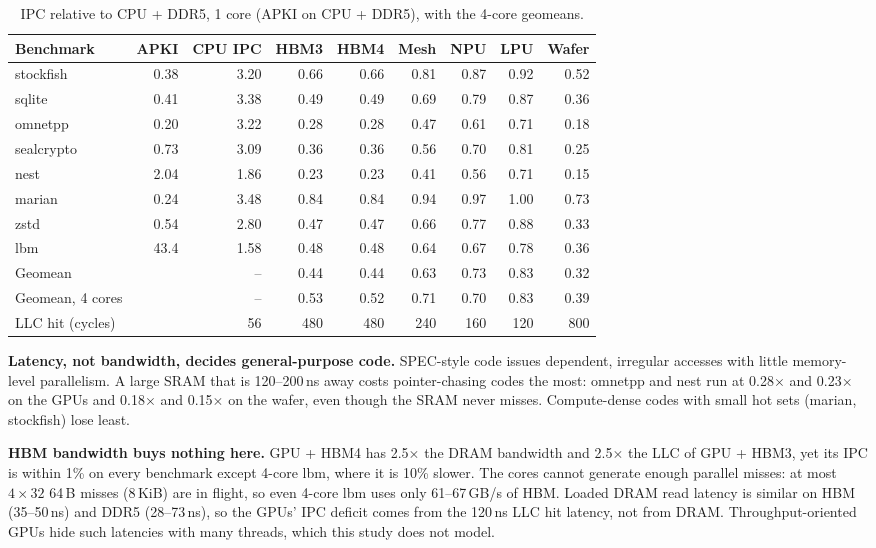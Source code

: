 \documentclass[12pt]{article}
\newcommand{\tmx}{\ensuremath{\times}}
\begin{document}
\begin{table}[htbp]
\centering
\caption{IPC relative to CPU + DDR5, 1 core (APKI on CPU + DDR5), with the 4-core geomeans.}
\label{tab:spec1}
\small
\setlength{\tabcolsep}{4pt}
\begin{tabular}{@{}lrrrrrrrr@{}}
\toprule
Benchmark & APKI & CPU IPC & HBM3 & HBM4 & Mesh & NPU & LPU & Wafer\\
\midrule
stockfish & 0.38 & 3.20 & 0.66 & 0.66 & 0.81 & 0.87 & 0.92 & 0.52\\
sqlite & 0.41 & 3.38 & 0.49 & 0.49 & 0.69 & 0.79 & 0.87 & 0.36\\
omnetpp & 0.20 & 3.22 & 0.28 & 0.28 & 0.47 & 0.61 & 0.71 & 0.18\\
sealcrypto & 0.73 & 3.09 & 0.36 & 0.36 & 0.56 & 0.70 & 0.81 & 0.25\\
nest & 2.04 & 1.86 & 0.23 & 0.23 & 0.41 & 0.56 & 0.71 & 0.15\\
marian & 0.24 & 3.48 & 0.84 & 0.84 & 0.94 & 0.97 & 1.00 & 0.73\\
zstd & 0.54 & 2.80 & 0.47 & 0.47 & 0.66 & 0.77 & 0.88 & 0.33\\
lbm & 43.4 & 1.58 & 0.48 & 0.48 & 0.64 & 0.67 & 0.78 & 0.36\\
\midrule
Geomean & & -- & 0.44 & 0.44 & 0.63 & 0.73 & 0.83 & 0.32\\
Geomean, 4 cores & & -- & 0.53 & 0.52 & 0.71 & 0.70 & 0.83 & 0.39\\
LLC hit (cycles) & & 56 & 480 & 480 & 240 & 160 & 120 & 800\\
\bottomrule
\end{tabular}
\end{table}





\textbf{Latency, not bandwidth, decides general-purpose code.} SPEC-style code issues dependent, irregular accesses with little memory-level parallelism. A large SRAM that is 120--200\,ns away costs pointer-chasing codes the most: omnetpp and nest run at 0.28\tmx{} and 0.23\tmx{} on the GPUs and 0.18\tmx{} and 0.15\tmx{} on the wafer, even though the SRAM never misses. Compute-dense codes with small hot sets (marian, stockfish) lose least.

\textbf{HBM bandwidth buys nothing here.} GPU + HBM4 has 2.5\tmx{} the DRAM bandwidth and 2.5\tmx{} the LLC of GPU + HBM3, yet its IPC is within 1\% on every benchmark except 4-core lbm, where it is 10\% slower. The cores cannot generate enough parallel misses: at most $4\times32$ 64\,B misses (8\,KiB) are in flight, so even 4-core lbm uses only 61--67\,GB/s of HBM. Loaded DRAM read latency is similar on HBM (35--50\,ns) and DDR5 (28--73\,ns), so the GPUs' IPC deficit comes from the 120\,ns LLC hit latency, not from DRAM. Throughput-oriented GPUs hide such latencies with many threads, which this study does not model.
\end{document}
